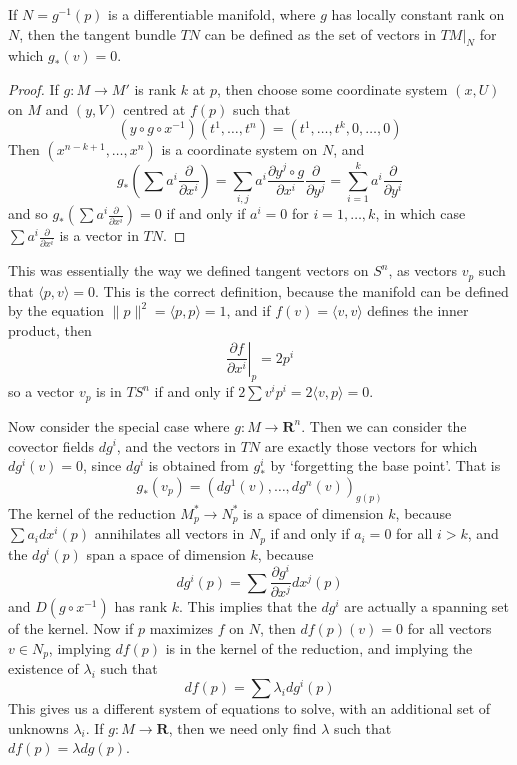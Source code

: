 \begin{theorem}
    If $N = g^{-1}(p)$ is a differentiable manifold, where $g$ has locally constant rank on $N$, then the tangent bundle $TN$ can be defined as the set of vectors in $TM|_N$ for which $g_*(v) = 0$.
\end{theorem}
\begin{proof}
    If $g: M \to M'$ is rank $k$ at $p$, then choose some coordinate system $(x,U)$ on $M$ and $(y,V)$ centred at $f(p)$ such that
    \[ (y \circ g \circ x^{-1})(t^1, \dots, t^n) = (t^1, \dots, t^k, 0, \dots, 0) \]
    Then $(x^{n-k+1}, \dots, x^n)$ is a coordinate system on $N$, and
    \[ g_* \left( \sum a^i \frac{\partial}{\partial x^i} \right) = \sum_{i,j} a^i \frac{\partial y^j \circ g}{\partial x^i} \frac{\partial}{\partial y^j} = \sum_{i = 1}^k a^i \frac{\partial}{\partial y^i} \]
    and so $g_* \left(\sum a^i \frac{\partial}{\partial x^i} \right) = 0$ if and only if $a^i = 0$ for $i = 1, \dots, k$, in which case $\sum a^i \frac{\partial}{\partial x^i}$ is a vector in $TN$.
\end{proof}

\begin{example}
This was essentially the way we defined tangent vectors on $S^n$, as vectors $v_p$ such that $\langle p, v \rangle = 0$. This is the correct definition, because the manifold can be defined by the equation $\| p \|^2 = \langle p, p \rangle = 1$, and if $f(v) = \langle v, v \rangle$ defines the inner product, then
%
\[ \left. \frac{\partial f}{\partial x^i} \right|_p = 2p^i \]
%
so a vector $v_p$ is in $TS^n$ if and only if $2 \sum v^i p^i = 2 \langle v, p \rangle = 0$.
\end{example}

Now consider the special case where $g: M \to \mathbf{R}^n$. Then we can consider the covector fields $dg^i$, and the vectors in $TN$ are exactly those vectors for which $dg^i(v) = 0$, since $dg^i$ is obtained from $g^i_*$ by `forgetting the base point'. That is
%
\[ g_*(v_p) = (dg^1(v), \dots, dg^n(v))_{g(p)} \]
%
The kernel of the reduction $M^*_p \to N^*_p$ is a space of dimension $k$, because $\sum a_i dx^i(p)$ annihilates all vectors in $N_p$ if and only if $a_i = 0$ for all $i > k$, and the $dg^i(p)$ span a space of dimension $k$, because
%
\[ dg^i(p) = \sum \frac{\partial g^i}{\partial x^j} dx^j(p) \]
%
and $D(g \circ x^{-1})$ has rank $k$. This implies that the $dg^i$ are actually a spanning set of the kernel. Now if $p$ maximizes $f$ on $N$, then $df(p)(v) = 0$ for all vectors $v \in N_p$, implying $df(p)$ is in the kernel of the reduction, and implying the existence of $\lambda_i$ such that
%
\[ df(p) = \sum \lambda_i dg^i(p) \]
%
This gives us a different system of equations to solve, with an additional set of unknowns $\lambda_i$. If $g: M \to \mathbf{R}$, then we need only find $\lambda$ such that $df(p) = \lambda dg(p)$.

